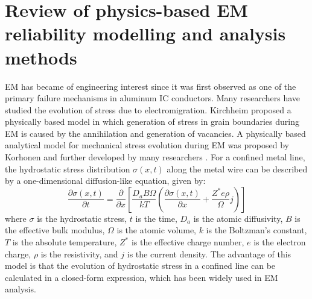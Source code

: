 \section{Review of physics-based EM reliability modelling and analysis methods}
\label{sec:reliability_modeling}
EM has became of engineering interest since it was first observed as one of the primary failure mechanisms in aluminum IC conductors. Many researchers have studied the evolution of stress due to electromigration. Kirchheim proposed a physically based model in which generation of stress in grain boundaries during EM is caused by the annihilation and generation of vacancies. A physically based analytical model for mechanical stress evolution during EM was proposed by Korhonen \cite{Korhonen:jap1993} and further developed by many researchers \cite{Clement:1999tcad, Sukharev:2015jap}. For a confined metal line, the hydrostatic stress distribution $\sigma(x,t)$ along the metal wire can be
described by a one-dimensional diffusion-like equation, given by:
\begin{equation}
\label{eq:basic_em}
\frac{\partial \sigma(x,t)}{\partial t}=\frac{\partial }{\partial x}\left[\frac{D_aB\Omega}{kT}\left(\frac{\partial \sigma(x,t)}{\partial x}+\frac{Z^*e\rho}{\Omega}j\right)\right]
\end{equation}
where $\sigma$ is the hydrostatic stress, $t$ is the time, $D_a$ is the atomic diffusivity, $B$ is the effective bulk modulus, $\Omega$ is the atomic volume, $k$ is the Boltzman's constant, $T$ is the absolute temperature, $Z^*$ is the effective charge number, $e$ is the electron charge, $\rho$ is the resistivity, and $j$ is the current density. The advantage of this model is that the evolution of hydrostatic stress in a confined line can be calculated in a closed-form expression, which has been widely used in EM analysis.


